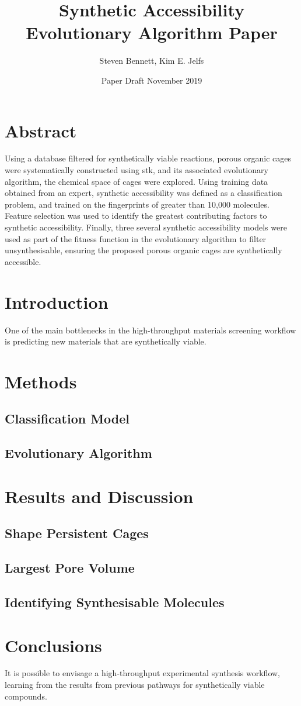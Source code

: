 \documentclass[12pt, letterpaper]{article}
\title{Synthetic Accessibility Evolutionary Algorithm Paper}
\author{Steven Bennett, Kim E. Jelfs}
\date{Paper Draft November 2019}
\begin{document}
\maketitle

\section{Abstract}
Using a database filtered for synthetically viable reactions, porous organic cages were
systematically constructed using stk, and its associated evolutionary algorithm, the
chemical space of cages were explored. Using training data obtained from an expert, synthetic
accessibility was defined as a classification problem, and trained on the fingerprints of greater
than 10,000 molecules. Feature selection was used to identify the greatest contributing factors
to synthetic accessibility. Finally, three several synthetic accessibility models were used as part
of the fitness function in the evolutionary algorithm to filter unsynthesisable, ensuring the proposed
porous organic cages are synthetically accessible.

\section{Introduction}
One of the main bottlenecks in the high-throughput materials screening workflow is predicting new materials
that are synthetically viable. 

\section{Methods}

\subsection{Classification Model}

\subsection{Evolutionary Algorithm}

\section{Results and Discussion}

\subsection{Shape Persistent Cages}

\subsection{Largest Pore Volume}

\subsection{Identifying Synthesisable Molecules}

\section{Conclusions}
It is possible to envisage a high-throughput experimental synthesis workflow, learning from the results from previous
pathways for synthetically viable compounds.
\end{document}
